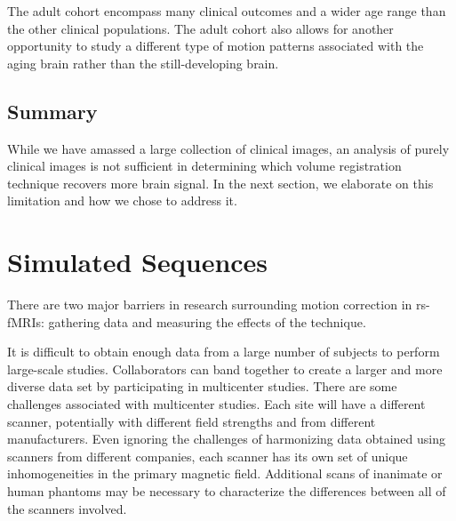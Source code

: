 

The adult cohort encompass many clinical outcomes and a wider age range than the other clinical populations. The adult cohort also allows for another opportunity to study a different type of motion patterns associated with the aging brain rather than the still-developing brain.

\subsection{Summary}

While we have amassed a large collection of clinical images, an analysis of purely clinical images is not sufficient in determining which volume registration technique recovers more brain signal. In the next section, we elaborate on this limitation and how we chose to address it.

\section{Simulated Sequences} %

There are two major barriers in research surrounding motion correction in rs-fMRIs: gathering data and measuring the effects of the technique. 

It is difficult to obtain enough data from a large number of subjects to perform large-scale studies. Collaborators can band together to create a larger and more diverse data set by participating in multicenter studies. There are some challenges associated with multicenter studies. Each site will have a different scanner, potentially with different field strengths and from different manufacturers. Even ignoring the challenges of harmonizing data obtained using scanners from different companies, each scanner has its own set of unique inhomogeneities in the primary magnetic field. Additional scans of inanimate or human phantoms may be necessary to characterize the differences between all of the scanners involved.

